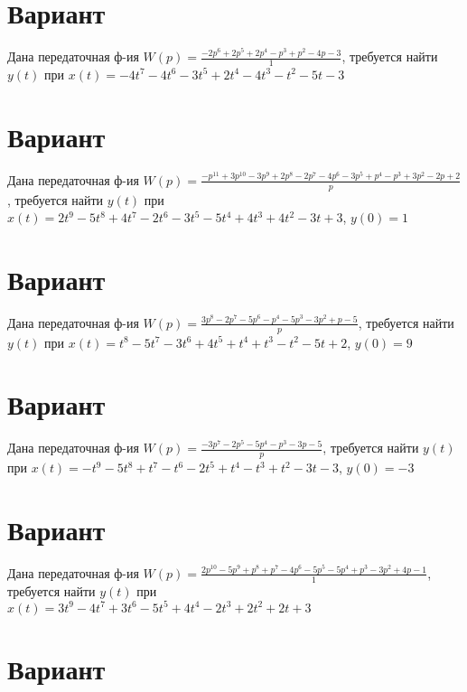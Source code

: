 \documentclass{article}
\begin{document}
\section{Вариант}

Дана передаточная ф-ия $W(p)=\frac{-2p^{6}+2p^{5}+2p^{4}-p^{3}+p^{2}-4p-3}{1}$, требуется найти $y(t)$ при $x(t)=-4t^{7}-4t^{6}-3t^{5}+2t^{4}-4t^{3}-t^{2}-5t-3$



\section{Вариант}

Дана передаточная ф-ия $W(p)=\frac{-p^{11}+3p^{10}-3p^{9}+2p^{8}-2p^{7}-4p^{6}-3p^{5}+p^{4}-p^{3}+3p^{2}-2p+2}{p}$, требуется найти $y(t)$ при $x(t)=2t^{9}-5t^{8}+4t^{7}-2t^{6}-3t^{5}-5t^{4}+4t^{3}+4t^{2}-3t+3$, $y(0)=1$



\section{Вариант}

Дана передаточная ф-ия $W(p)=\frac{3p^{8}-2p^{7}-5p^{6}-p^{4}-5p^{3}-3p^{2}+p-5}{p}$, требуется найти $y(t)$ при $x(t)=t^{8}-5t^{7}-3t^{6}+4t^{5}+t^{4}+t^{3}-t^{2}-5t+2$, $y(0)=9$



\section{Вариант}

Дана передаточная ф-ия $W(p)=\frac{-3p^{7}-2p^{5}-5p^{4}-p^{3}-3p-5}{p}$, требуется найти $y(t)$ при $x(t)=-t^{9}-5t^{8}+t^{7}-t^{6}-2t^{5}+t^{4}-t^{3}+t^{2}-3t-3$, $y(0)=-3$



\section{Вариант}

Дана передаточная ф-ия $W(p)=\frac{2p^{10}-5p^{9}+p^{8}+p^{7}-4p^{6}-5p^{5}-5p^{4}+p^{3}-3p^{2}+4p-1}{1}$, требуется найти $y(t)$ при $x(t)=3t^{9}-4t^{7}+3t^{6}-5t^{5}+4t^{4}-2t^{3}+2t^{2}+2t+3$



\section{Вариант}
\end{document}

